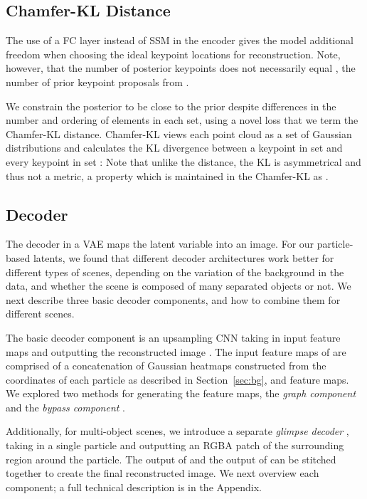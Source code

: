\documentclass[nohyperref]{article}
\theoremstyle{plain}
\theoremstyle{definition}
\theoremstyle{remark}
\begin{document}
\subsection{Chamfer-KL Distance}\label{subsec:chamfer_kl} 
The use of a FC layer instead of SSM in the encoder gives the model additional freedom when choosing the ideal keypoint locations for reconstruction. 
Note, however, that the number of posterior keypoints  does not necessarily equal , the number of prior keypoint proposals from . 

We constrain the posterior to be close to the prior despite differences in the number and ordering of elements in each set, using a novel loss that we term the Chamfer-KL distance. 
Chamfer-KL views each point cloud as a set of Gaussian distributions and calculates the KL divergence between a keypoint in set  and every keypoint in set :  Note that unlike the  distance, the KL is asymmetrical and thus not a metric, a property which is maintained in the Chamfer-KL as . 


\subsection{Decoder}
\label{subsec:kp_dec}
The decoder in a VAE maps the latent variable  into an image. For our  particle-based latents, we found that different decoder architectures work better for different types of scenes, depending on the variation of the background in the data, and whether the scene is composed of many separated objects or not. We next describe three basic decoder components, and how to combine them for different scenes.

The basic decoder component is an upsampling CNN  
taking in input feature maps 
and outputting the reconstructed image . The input feature maps of  are comprised of a concatenation of Gaussian heatmaps  constructed from the coordinates of each particle as described in Section~\ref{sec:bg}, and feature maps. We explored two methods for  generating the feature maps, the \textit{graph component}  and the  \textit{bypass component} . 

Additionally, for multi-object scenes, we introduce a separate \textit{glimpse decoder} , taking in a single particle and outputting an RGBA patch of the surrounding region around the particle. The output of  and the output of  can be stitched together to create the final reconstructed image. We next overview each component; a full technical description is in the Appendix.
\end{document}
